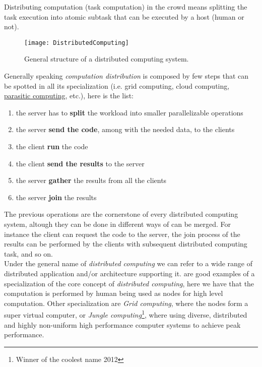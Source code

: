 




Distributing computation (task computation) in the crowd means splitting
the task execution into atomic subtask that can be executed by a host (human or
not).

\begin{figure}[htb]
    \centering
    \texttt{[image: DistributedComputing]}
    \caption{General structure of a distributed computing system.}
    \label{fig:distributed-computing}
\end{figure}
Generally speaking \emph{computation distribution} is composed by few steps that
can be spotted in all its specialization (i.e. grid computing, cloud computing,
\hyperref[sec:bg:crowd:auto:parasitic]{parasitic computing}, etc.), here is the list:
\begin{enumerate}
    \item the server has to \textbf{split} the workload into smaller parallelizable
    operations
    \item the server \textbf{send the code}, among with the needed data, to the clients
    \item the client \textbf{run} the code
    \item the client \textbf{send the results} to the server
    \item the server \textbf{gather} the results from all the clients
    \item the server \textbf{join} the results
\end{enumerate}
The previous operations are the cornerstone of every distributed computing system,
altough they can be done in different ways of can be merged. For instance the
client can request the code to the server, the join process of the results can
be performed by the clients with subsequent distributed computing task, and so on.\\

Under the general name of \emph{distributed computing} we can refer to a wide
range of distributed application and/or architecture supporting it.
 are good examples of a specialization of the core
concept of \emph{distributed computing}, here we have that the computation is
performed by human being used as nodes for high level computation. Other
specialization are \emph{Grid computing}, where the nodes form a super virtual
computer, or \emph{Jungle computing}\footnote{Winner of the coolest name 2012},
where using diverse, distributed and highly non-uniform high performance computer
systems to achieve peak performance.\\


